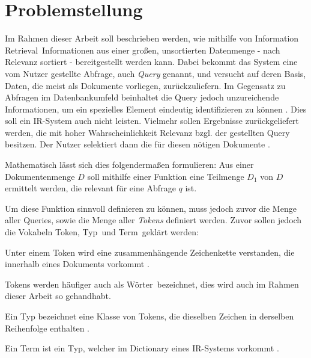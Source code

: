 \section{Problemstellung}
Im Rahmen dieser Arbeit soll beschrieben werden, wie mithilfe von \glqq Information Retrieval\grqq\ Informationen aus einer großen, unsortierten Datenmenge - nach Relevanz sortiert - bereitgestellt werden kann. Dabei bekommt das System eine vom Nutzer gestellte Abfrage, auch \textit{Query} genannt, und versucht auf deren Basis, Daten, die meist als Dokumente vorliegen, zurückzuliefern. Im Gegensatz zu Abfragen im Datenbankumfeld beinhaltet die Query jedoch unzureichende Informationen, um ein spezielles Element eindeutig identifizieren zu können \cite[S. 1 f.]{IR_Intro_Cambridge}. Dies soll ein IR-System auch nicht leisten. Vielmehr sollen Ergebnisse zurückgeliefert werden, die mit hoher Wahrscheinlichkeit Relevanz bzgl. der gestellten Query besitzen. Der Nutzer selektiert dann die für diesen nötigen Dokumente \cite[S. 1 f.]{IR_Intro_Cambridge}.

Mathematisch lässt sich dies folgendermaßen formulieren: Aus einer Dokumentenmenge $D$ soll mithilfe einer Funktion eine Teilmenge $D_1$ von $D$ ermittelt werden, die relevant für eine Abfrage $q$ ist.

Um diese Funktion sinnvoll definieren zu können, muss jedoch zuvor die Menge aller Queries, sowie die Menge aller \textit{Tokens} definiert werden. Zuvor sollen jedoch die Vokabeln \glqq Token\grqq, \glqq Typ\grqq\ und \glqq Term\grqq\ geklärt werden:

\begin{defi}[Token]\label{def:Token}
	Unter einem Token wird eine zusammenhängende Zeichenkette verstanden, die innerhalb eines Dokuments vorkommt \cite[S. 22]{IR_Intro_Cambridge}.
\end{defi}

Tokens werden häufiger auch als \glqq Wörter\grqq\ bezeichnet, dies wird auch im Rahmen dieser Arbeit so gehandhabt.

\begin{defi}[Typ]\label{def:Typ}
	Ein Typ bezeichnet eine Klasse von Tokens, die dieselben Zeichen in derselben Reihenfolge enthalten \cite[S. 22]{IR_Intro_Cambridge}.
\end{defi}

\begin{defi}[Term]\label{def:Term}
	Ein Term ist ein Typ, welcher im Dictionary eines IR-Systems vorkommt \cite[S. 22]{IR_Intro_Cambridge}.
\end{defi}

